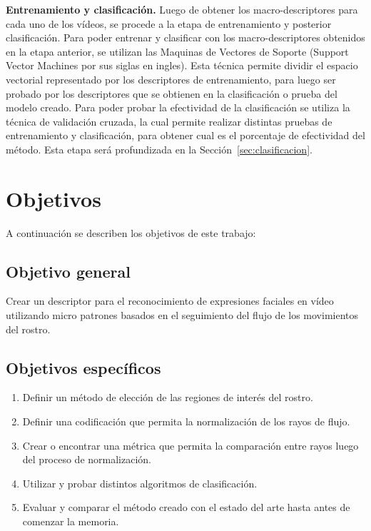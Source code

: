 \textbf{Entrenamiento y clasificación.}
Luego de obtener los macro-des\-crip\-tores para cada uno de los vídeos, se procede a la etapa de entrenamiento y posterior clasificación. Para poder entrenar y clasificar con los macro-descriptores obtenidos en la etapa anterior, se utilizan las Maquinas de Vectores de Soporte (Support Vector Machines por sus siglas en ingles). Esta técnica permite dividir el espacio vectorial representado por los descriptores de entrenamiento, para luego ser probado por los descriptores que se obtienen en la clasificación o prueba del modelo creado. Para poder probar la efectividad de la clasificación se utiliza la técnica de validación cruzada, la cual permite realizar distintas pruebas de entrenamiento y clasificación, para obtener cual es el porcentaje de efectividad del método. Esta etapa será profundizada en la Sección~\ref{sec:clasificacion}.


\section{Objetivos}
\label{subsec:objetivos}
A continuación se describen los objetivos de este trabajo:

\subsection{Objetivo general}
\label{subsubsec:objgeneral}
Crear un descriptor para el reconocimiento de expresiones faciales en vídeo utilizando micro patrones basados en el seguimiento del flujo de los movimientos del rostro.

\subsection{Objetivos específicos}
\label{subsubsec:objgeneral}
	\begin{enumerate}
		\item Definir un método de elección de las regiones de interés del rostro.
		\item Definir una codificación que permita la normalización de los rayos de flujo.
		\item Crear o encontrar una métrica que permita la comparación entre rayos luego del proceso de normalización.
		\item Utilizar y probar distintos algoritmos de clasificación.
		\item Evaluar y comparar el método creado con el estado del arte hasta antes de comenzar la memoria. 
	\end{enumerate}